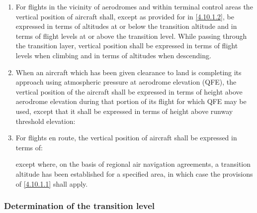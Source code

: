 \documentclass[../vATM.tex]{subfiles}
\begin{document}
    \begin{enumerate}
        \item \label{4.10.1.1} For flights in the vicinity of aerodromes and within terminal control areas the vertical position of aircraft shall, except as provided for in \ref{4.10.1.2}, be expressed in terms of altitudes at or below the transition altitude and in terms of flight levels at or above the transition level. While passing through the transition layer, vertical position shall be expressed in terms of flight levels when climbing and in terms of altitudes when descending.
        \item \label{4.10.1.2} When an aircraft which has been given clearance to land is completing its approach using atmospheric pressure at aerodrome elevation (QFE), the vertical position of the aircraft shall be expressed in terms of height above aerodrome elevation during that portion of its flight for which QFE may be used, except that it shall be expressed in terms of height above runway threshold elevation:


        \item For flights en route, the vertical position of aircraft shall be expressed in terms of:


        \noindent except where, on the basis of regional air navigation agreements, a transition altitude has been established for a specified area, in which case the provisions of \ref{4.10.1.1} shall apply.
    \end{enumerate}

    \subsubsection{Determination of the transition level}
\end{document}
